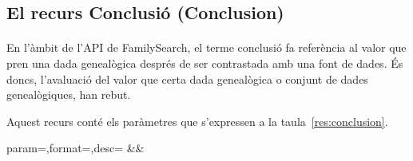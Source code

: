 \subsection{El recurs Conclusió (Conclusion)}

    \paragraph{}
    En l'àmbit de l'API de FamilySearch, el terme conclusió fa referència al valor que pren una dada genealògica després de ser contrastada amb una font de dades. És doncs, l'avaluació del valor que certa dada genealògica o conjunt de dades genealògiques, han rebut.

    Aquest recurs conté els paràmetres que s'expressen a la taula~\ref{res:conclusion}.

    \begin{center}
             {param=\param,format=\format,desc=\desc}
             {\param&\format&\desc}
     \end{center}
